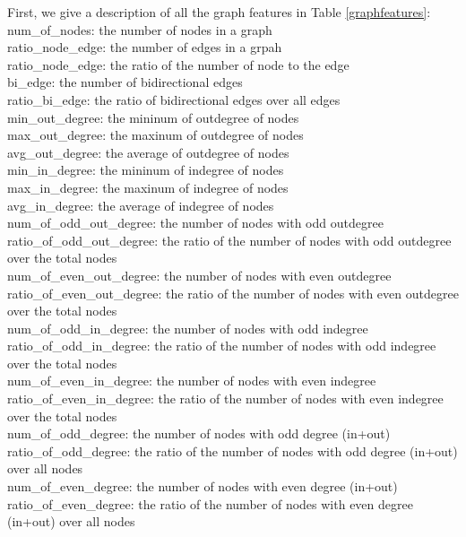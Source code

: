 \documentclass{new_tlp}
\begin{document}
\begin{appendices}
First, we give a description of all the graph features in Table \ref{graphfeatures}:\\
num\_of\_nodes: the number of nodes in a graph\\
ratio\_node\_edge: the number of edges in a grpah\\
ratio\_node\_edge: the ratio of the number of node to the edge\\
bi\_edge: the number of bidirectional edges\\
ratio\_bi\_edge: the ratio of bidirectional edges over all edges\\
min\_out\_degree: the mininum of outdegree of nodes\\
max\_out\_degree: the maxinum of outdegree of nodes\\
avg\_out\_degree: the average of outdegree of nodes\\
min\_in\_degree: the mininum of indegree of nodes\\
max\_in\_degree: the maxinum of indegree of nodes\\
avg\_in\_degree: the average of indegree of nodes\\
num\_of\_odd\_out\_degree: the number of nodes with odd outdegree\\
ratio\_of\_odd\_out\_degree: the ratio of the number of nodes with odd outdegree over the total nodes\\
num\_of\_even\_out\_degree: the number of nodes with even outdegree\\
ratio\_of\_even\_out\_degree: the ratio of the number of nodes with even outdegree over the total nodes\\
num\_of\_odd\_in\_degree: the number of nodes with odd indegree\\
ratio\_of\_odd\_in\_degree: the ratio of the number of nodes with odd indegree over the total nodes\\
num\_of\_even\_in\_degree: the number of nodes with even indegree\\
ratio\_of\_even\_in\_degree: the ratio of the number of nodes with even indegree over the total nodes\\
num\_of\_odd\_degree: the number of nodes with odd degree (in+out)\\
ratio\_of\_odd\_degree: the ratio of the number of nodes with odd degree (in+out) over all nodes\\
num\_of\_even\_degree: the number of nodes with even degree (in+out)\\
ratio\_of\_even\_degree: the ratio of the number of nodes with even degree (in+out) over all nodes\\

\end{appendices}
\end{document}
